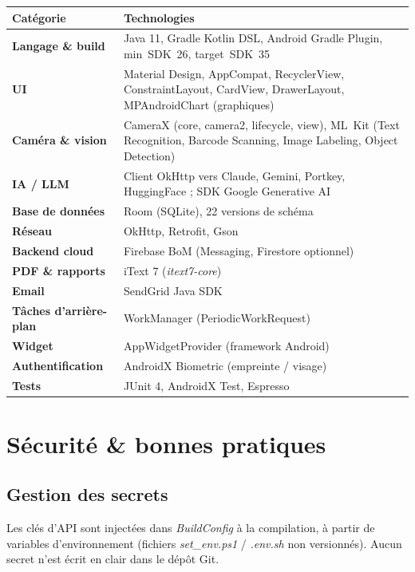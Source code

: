 \documentclass[11pt,a4paper]{article}
\begin{document}
\begin{tabularx}{\linewidth}{@{}lX@{}}
\toprule
\textbf{Catégorie} & \textbf{Technologies}\\
\midrule
\textbf{Langage \& build}      & Java 11, Gradle Kotlin DSL, Android Gradle Plugin, min~SDK~26, target~SDK~35 \\
\textbf{UI}                    & Material Design, AppCompat, RecyclerView, ConstraintLayout, CardView, DrawerLayout, MPAndroidChart (graphiques)\\
\textbf{Caméra \& vision}      & CameraX (core, camera2, lifecycle, view), ML~Kit (Text Recognition, Barcode Scanning, Image Labeling, Object Detection)\\
\textbf{IA / LLM}              & Client OkHttp vers Claude, Gemini, Portkey, HuggingFace ; SDK Google Generative AI\\
\textbf{Base de données}       & Room (SQLite), 22 versions de schéma \\
\textbf{Réseau}                & OkHttp, Retrofit, Gson\\
\textbf{Backend cloud}         & Firebase BoM (Messaging, Firestore optionnel)\\
\textbf{PDF \& rapports}       & iText 7 (\emph{itext7-core}) \\
\textbf{Email}                 & SendGrid Java SDK \\
\textbf{Tâches d'arrière-plan} & WorkManager (PeriodicWorkRequest) \\
\textbf{Widget}                & AppWidgetProvider (framework Android) \\
\textbf{Authentification}      & AndroidX Biometric (empreinte / visage) \\
\textbf{Tests}                 & JUnit 4, AndroidX Test, Espresso \\
\bottomrule
\end{tabularx}

\section{Sécurité \& bonnes pratiques}

\subsection{Gestion des secrets}
Les clés d'API sont injectées dans \emph{BuildConfig} à la
compilation, à partir de variables d'environnement (fichiers
\emph{set\_env.ps1} / \emph{.env.sh} non versionnés). Aucun secret
n'est écrit en clair dans le dépôt Git.
\end{document}
